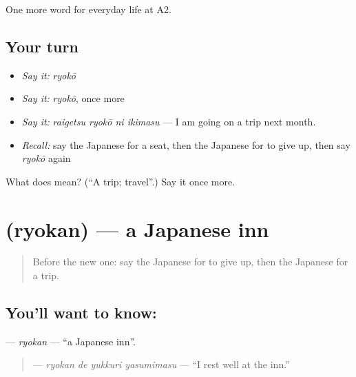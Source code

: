 \begin{grammarlens}[title={What you've built}]
One more word for everyday life at A2.
\end{grammarlens}

\subsection*{Your turn}
\begin{itemize}
\raggedright
  \item \emph{Say it:} \emph{ryokō}
  \item \emph{Say it:} \emph{ryokō}, once more
  \item \emph{Say it:} \emph{raigetsu ryokō ni ikimasu} — I am going on a trip next month.
  \item \emph{Recall:} say the Japanese for a seat, then the Japanese for to give up, then say \emph{ryokō} again
\end{itemize}

\begin{tcolorbox}[breakable,colback=teal!4,colframe=teal!35!black,title={Before you move on}]
What does  mean? (\textquotedblleft{}A trip; travel\textquotedblright{}.) Say it once more.
\end{tcolorbox}
\section[\texorpdfstring{\ja{りょかん} (ryokan)}{りょかん (ryokan)}]{ (ryokan) — a Japanese inn}

\label{lesson:JA-C204-ryokan}



\begin{quote}
Before the new one: say the Japanese for to give up, then the Japanese for a trip.
\end{quote}

\subsection*{You'll want to know: }
\textbf{} — \emph{ryokan} — \textquotedblleft{}a Japanese inn\textquotedblright{}.

\begin{quote}
\textbf{  } — \emph{ryokan de yukkuri yasumimasu} — \textquotedblleft{}I rest well at the inn.\textquotedblright{}
\end{quote}

